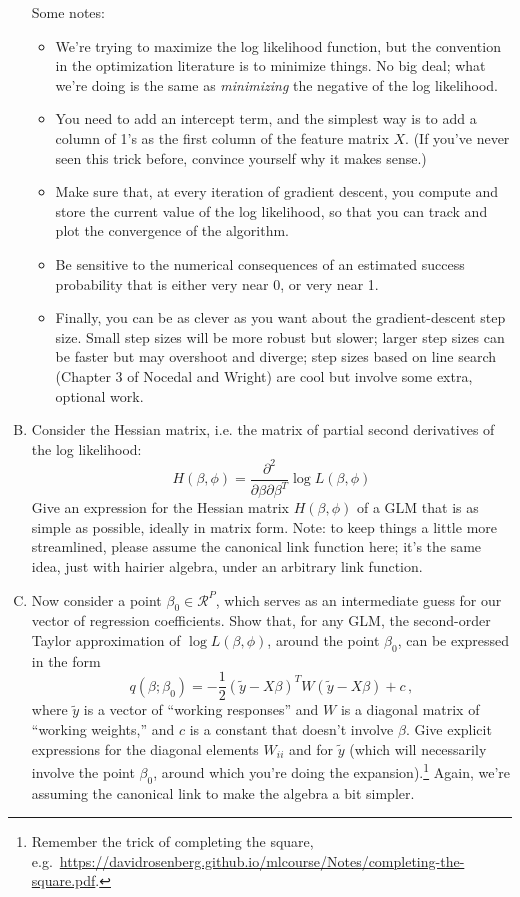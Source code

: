 \documentclass[11pt]{article}
\begin{document}
\begin{enumerate}[(A)]
Some notes:
\begin{itemize}
\item We're trying to maximize the log likelihood function, but the convention in the optimization literature is to minimize things.  No big deal; what we're doing is the same as \textit{minimizing} the negative of the log likelihood.  
\item You need to add an intercept term, and the simplest way is to add a column of 1's as the first column of the feature matrix $X$.  (If you've never seen this trick before, convince yourself why it makes sense.)  
\item Make sure that, at every iteration of gradient descent, you compute and store the current value of the log likelihood, so that you can track and plot the convergence of the algorithm.
\item Be sensitive to the numerical consequences of an estimated success probability that is either very near 0, or very near 1.
\item Finally, you can be as clever as you want about the gradient-descent step size.  Small step sizes will be more robust but slower; larger step sizes can be faster but may overshoot and diverge; step sizes based on line search (Chapter 3 of Nocedal and Wright) are cool but involve some extra, optional work.
\end{itemize}

\item Consider the Hessian matrix, i.e. the matrix of partial second derivatives of the log likelihood:  
$$
H(\beta, \phi) = \frac{\partial^2}{\partial \beta \partial \beta^T} \log L(\beta, \phi) 
$$
Give an expression for the Hessian matrix $H(\beta, \phi)$ of a GLM that is as simple as possible, ideally in matrix form.   Note: to keep things a little more streamlined, please assume the canonical link function here; it's the same idea, just with hairier algebra, under an arbitrary link function.  

\item Now consider a point $\beta_0 \in \mathcal{R}^P$, which serves as an intermediate guess for our vector of regression coefficients.  Show that, for any GLM, the second-order Taylor approximation of $\log L(\beta, \phi)$, around the point $\beta_0$, can be expressed in the form
$$
q(\beta; \beta_0) = -\frac{1}{2}(\tilde{y} - X \beta)^T W (\tilde{y} - X \beta) + c\, ,
$$
where $\tilde{y}$ is a vector of ``working responses'' and $W$ is a diagonal matrix of ``working weights,'' and $c$ is a constant that doesn't involve $\beta$.  Give explicit expressions for the diagonal elements $W_{ii}$ and for $\tilde{y}$ (which will necessarily involve the point $\beta_0$, around which you're doing the expansion).\footnote{Remember the trick of completing the square, e.g.~\url{https://davidrosenberg.github.io/mlcourse/Notes/completing-the-square.pdf}.} Again, we're assuming the canonical link to make the algebra a bit simpler.  


\end{enumerate}
\end{document}
